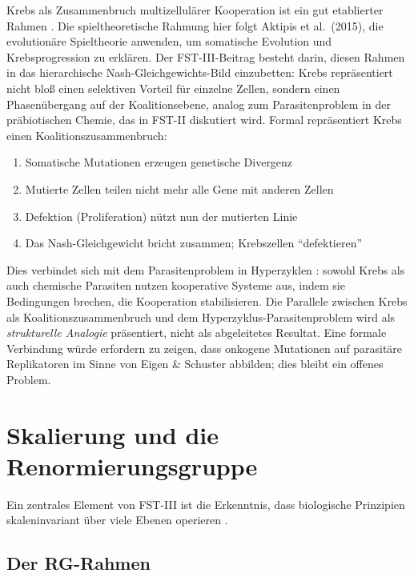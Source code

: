 \documentclass[12pt,a4paper]{article}
\theoremstyle{remark}
\begin{document}
Krebs als Zusammenbruch multizellul\"arer Kooperation ist ein gut etablierter Rahmen \citep{AktipisCancer}. Die spieltheoretische Rahmung hier folgt Aktipis et al.\ (2015), die evolution\"are Spieltheorie anwenden, um somatische Evolution und Krebsprogression zu erkl\"aren. Der FST-III-Beitrag besteht darin, diesen Rahmen in das hierarchische Nash-Gleichgewichts-Bild einzubetten: Krebs repr\"asentiert nicht blo\ss{} einen selektiven Vorteil f\"ur einzelne Zellen, sondern einen Phasen\"ubergang auf der Koalitionsebene, analog zum Parasitenproblem in der pr\"abiotischen Chemie, das in FST-II diskutiert wird. Formal repr\"asentiert Krebs einen Koalitionszusammenbruch:
\begin{enumerate}
    \item Somatische Mutationen erzeugen genetische Divergenz
    \item Mutierte Zellen teilen nicht mehr alle Gene mit anderen Zellen
    \item Defektion (Proliferation) n\"utzt nun der mutierten Linie
    \item Das Nash-Gleichgewicht bricht zusammen; Krebszellen ``defektieren''
\end{enumerate}

Dies verbindet sich mit dem Parasitenproblem in Hyperzyklen \citep{FSTII}: sowohl Krebs als auch chemische Parasiten nutzen kooperative Systeme aus, indem sie Bedingungen brechen, die Kooperation stabilisieren. Die Parallele zwischen Krebs als Koalitionszusammenbruch und dem Hyperzyklus-Parasitenproblem wird als \emph{strukturelle Analogie} pr\"asentiert, nicht als abgeleitetes Resultat. Eine formale Verbindung w\"urde erfordern zu zeigen, dass onkogene Mutationen auf parasit\"are Replikatoren im Sinne von Eigen \& Schuster abbilden; dies bleibt ein offenes Problem.

\section{Skalierung und die Renormierungsgruppe}
\label{sec:renormalization}

Ein zentrales Element von FST-III ist die Erkenntnis, dass biologische Prinzipien skaleninvariant \"uber viele Ebenen operieren \citep{ScaleRGFrontiers,ScaleRGResearch}.

\subsection{Der RG-Rahmen}
\end{document}
